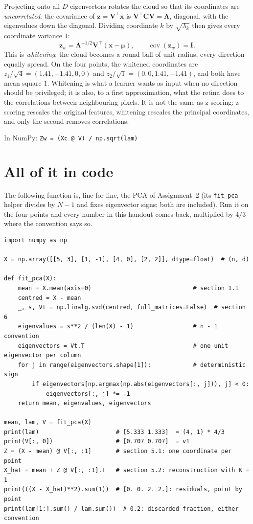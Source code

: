 \documentclass[11pt]{article}
\newcommand{\vx}{\bm{x}}
\newcommand{\vz}{\bm{z}}
\newcommand{\vmu}{\bm{\mu}}
\newcommand{\mC}{\bm{C}}
\newcommand{\mV}{\bm{V}}
\newcommand{\mI}{\bm{I}}
\newcommand{\mL}{\bm{\Lambda}}
\newcommand{\np}[1]{{\small\color{lightgray}In NumPy: \texttt{#1}}\par}
\begin{document}
Projecting onto all $D$ eigenvectors rotates the cloud so that its coordinates are
\emph{uncorrelated}: the covariance of $\vz = \mV^{\top}\tilde{\vx}$ is $\mV^{\top}\mC\mV =
\mL$, diagonal, with the eigenvalues down the diagonal. Dividing coordinate $k$ by
$\sqrt{\lambda_k}$ then gives every coordinate variance $1$:
\[
\vz_w = \mL^{-1/2}\mV^{\top}(\vx - \vmu), \qquad \operatorname{cov}(\vz_w) = \mI .
\]
This is \emph{whitening}: the cloud becomes a round ball of unit radius, every direction
equally spread. On the four points, the whitened coordinates are
$z_1/\sqrt4 = (1.41, -1.41, 0, 0)$ and $z_2/\sqrt1 = (0, 0, 1.41, -1.41)$, and both have
mean square $1$. Whitening is what a learner wants as input when no direction should be
privileged; it is also, to a first approximation, what the retina does to the
correlations between neighbouring pixels. It is not the same as z-scoring: z-scoring
rescales the original features, whitening rescales the principal coordinates, and only the
second removes correlations.

\np{Zw = (Xc @ V) / np.sqrt(lam)}

\section{All of it in code}

The following function is, line for line, the PCA of Assignment~2 (its \texttt{fit\_pca}
helper divides by $N-1$ and fixes eigenvector signs; both are included). Run it on the
four points and every number in this handout comes back, multiplied by $4/3$ where the
convention says so.

\begin{tcolorbox}[colback=codebg, colframe=codebg, arc=0pt, boxrule=0pt, left=4pt, right=4pt, top=2pt, bottom=2pt]
\small\begin{verbatim}
import numpy as np

X = np.array([[5, 3], [1, -1], [4, 0], [2, 2]], dtype=float)  # (n, d)

def fit_pca(X):
    mean = X.mean(axis=0)                             # section 1.1
    centred = X - mean
    _, s, Vt = np.linalg.svd(centred, full_matrices=False)  # section 6
    eigenvalues = s**2 / (len(X) - 1)                 # n - 1 convention
    eigenvectors = Vt.T                               # one unit eigenvector per column
    for j in range(eigenvectors.shape[1]):            # deterministic sign
        if eigenvectors[np.argmax(np.abs(eigenvectors[:, j])), j] < 0:
            eigenvectors[:, j] *= -1
    return mean, eigenvalues, eigenvectors

mean, lam, V = fit_pca(X)
print(lam)                      # [5.333 1.333]  = (4, 1) * 4/3
print(V[:, 0])                  # [0.707 0.707]  = v1
Z = (X - mean) @ V[:, :1]       # section 5.1: one coordinate per point
X_hat = mean + Z @ V[:, :1].T   # section 5.2: reconstruction with K = 1
print(((X - X_hat)**2).sum(1))  # [0. 0. 2. 2.]: residuals, point by point
print(lam[1:].sum() / lam.sum())  # 0.2: discarded fraction, either convention
\end{verbatim}
\end{tcolorbox}
\end{document}
